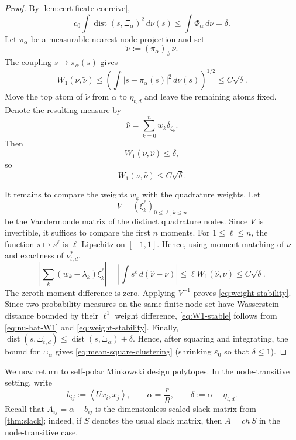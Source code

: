 \documentclass[11pt]{amsart}
\theoremstyle{definition}
\theoremstyle{remark}
\newcommand{\ip}[2]{\left\langle #1,#2\right\rangle}
\begin{document}
\begin{proof}
By \cref{lem:certificate-coercive},
\[
 c_0\int\operatorname{dist}(s,\Xi_\alpha)^2\,d\nu(s)
 \le\int\Phi_\alpha\,d\nu
 =\delta.
\]
Let $\pi_\alpha$ be a measurable nearest-node projection and set
\[
 \widetilde\nu:=(\pi_\alpha)_\#\nu.
\]
The coupling $s\mapsto\pi_\alpha(s)$ gives
\begin{equation}\label{eq:projection-W1}
 W_1(\nu,\widetilde\nu)
 \le\left(\int|s-\pi_\alpha(s)|^2\,d\nu(s)\right)^{1/2}
 \le C\sqrt\delta.
\end{equation}
Move the top atom of $\widetilde\nu$ from $\alpha$ to $\eta_{t,d}$ and leave the remaining atoms fixed.  Denote the resulting measure by
\[
 \widehat\nu=\sum_{k=0}^n w_k\delta_{\xi_k}.
\]
Then
\[
 W_1(\widetilde\nu,\widehat\nu)\le\delta,
\]
so
\begin{equation}\label{eq:nu-hat-W1}
 W_1(\nu,\widehat\nu)\le C\sqrt\delta.
\end{equation}

It remains to compare the weights $w_k$ with the quadrature weights.  Let
\[
 V=(\xi_k^\ell)_{0\le\ell,k\le n}
\]
be the Vandermonde matrix of the distinct quadrature nodes.  Since $V$ is invertible, it suffices to compare the first $n$ moments.  For $1\le\ell\le n$, the function $s\mapsto s^\ell$ is $\ell$-Lipschitz on $[-1,1]$.  Hence, using moment matching of $\nu$ and exactness of $\nu_{t,d}^*$,
\[
 \left|\sum_k(w_k-\lambda_k)\xi_k^\ell\right|
 =\left|\int s^\ell\,d(\widehat\nu-\nu)\right|
 \le \ell W_1(\widehat\nu,\nu)
 \le C\sqrt\delta.
\]
The zeroth moment difference is zero.  Applying $V^{-1}$ proves \eqref{eq:weight-stability}.  Since two probability measures on the same finite node set have Wasserstein distance bounded by their $\ell^1$ weight difference, \eqref{eq:W1-stable} follows from \eqref{eq:nu-hat-W1} and \eqref{eq:weight-stability}.  Finally, $\operatorname{dist}(s,\Xi_{t,d})\le \operatorname{dist}(s,\Xi_\alpha)+\delta$.  Hence, after squaring and integrating, the bound for $\Xi_\alpha$ gives \eqref{eq:mean-square-clustering} (shrinking $\varepsilon_0$ so that $\delta\le1$).  \qedhere
\end{proof}

We now return to self-polar Minkowski design polytopes.  In the node-transitive setting, write
\[
 b_{ij}:=\ip{Ux_i}{x_j},
 \qquad
 \alpha=\frac rR,
 \qquad
 \delta:=\alpha-\eta_{t,d}.
\]
Recall that $A_{ij}=\alpha-b_{ij}$ is the dimensionless scaled slack matrix from \cref{thm:slack}; indeed, if $S$ denotes the usual slack matrix, then $A=ch\,S$ in the node-transitive case.
\end{document}
